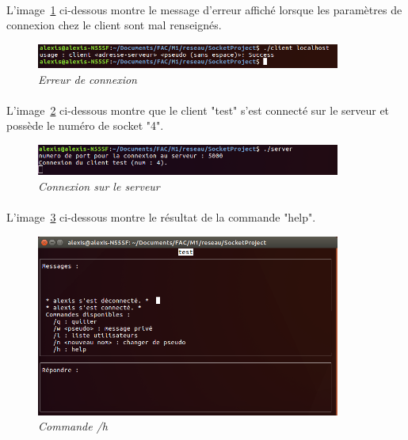     \paragraph{}
    L'image~\ref{fig:erreur_connexion} ci-dessous montre le message d'erreur affiché lorsque les paramètres de connexion chez le client sont mal renseignés.
    \begin{figure}[!htpb]
        \centering
        \includegraphics[width=10cm]{captures/erreur_connexion.png}
        \caption{\textit{Erreur de connexion}}
        \label{fig:erreur_connexion}
    \end{figure}
    
    \FloatBarrier
    
    \paragraph{}
    L'image~\ref{fig:connexion_serveur} ci-dessous montre que le client "test" s'est connecté sur le serveur et possède le numéro de socket "4".
    \begin{figure}[!htpb]
        \centering
        \includegraphics[width=10cm]{captures/connexion_serveur.png}
        \caption{\textit{Connexion sur le serveur}}
        \label{fig:connexion_serveur}
    \end{figure}
    
    \FloatBarrier
    
    \paragraph{}
    L'image~\ref{fig:cmd_help} ci-dessous montre le résultat de la commande "help".
    \begin{figure}[!htpb]
        \centering
        \includegraphics[width=10cm]{captures/cmd_help.png}
        \caption{\textit{Commande /h}}
        \label{fig:cmd_help}
    \end{figure}
    
